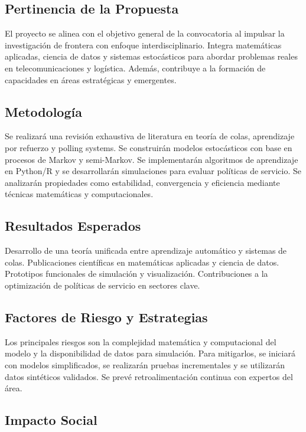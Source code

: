 \documentclass[12pt]{article}
\begin{document}
\subsection*{Pertinencia de la Propuesta}

El proyecto se alinea con el objetivo general de la convocatoria al impulsar la investigación de frontera con enfoque interdisciplinario. Integra matemáticas aplicadas, ciencia de datos y sistemas estocásticos para abordar problemas reales en telecomunicaciones y logística. Además, contribuye a la formación de capacidades en áreas estratégicas y emergentes.

\subsection*{Metodología}

Se realizará una revisión exhaustiva de literatura en teoría de colas, aprendizaje por refuerzo y polling systems. Se construirán modelos estocásticos con base en procesos de Markov y semi-Markov. Se implementarán algoritmos de aprendizaje en Python/R y se desarrollarán simulaciones para evaluar políticas de servicio. Se analizarán propiedades como estabilidad, convergencia y eficiencia mediante técnicas matemáticas y computacionales.

\subsection*{Resultados Esperados}

Desarrollo de una teoría unificada entre aprendizaje automático y sistemas de colas. Publicaciones científicas en matemáticas aplicadas y ciencia de datos. Prototipos funcionales de simulación y visualización. Contribuciones a la optimización de políticas de servicio en sectores clave.

\subsection*{Factores de Riesgo y Estrategias}

Los principales riesgos son la complejidad matemática y computacional del modelo y la disponibilidad de datos para simulación. Para mitigarlos, se iniciará con modelos simplificados, se realizarán pruebas incrementales y se utilizarán datos sintéticos validados. Se prevé retroalimentación continua con expertos del área.

\subsection*{Impacto Social}
\end{document}
